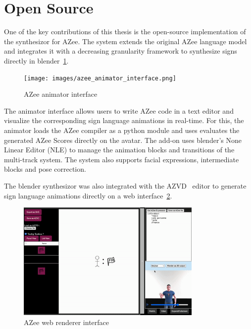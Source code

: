 \documentclass[../../main.tex]{subfiles}
\begin{document}
\section{Open Source}
\label{ch:conclusion:opensource}

One of the key contributions of this thesis is the open-source implementation of the synthesizor for AZee. The system extends the original AZee language model and integrates it with a decreasing granularity framework to synthesize signs directly in blender~\ref{fig:azee_animator_interface}.

\begin{figure}[ht]
    \centering
    \texttt{[image: images/azee\_animator\_interface.png]}
    \caption{AZee animator interface}
    \label{fig:azee_animator_interface}
\end{figure}

The animator interface allows users to write AZee code in a text editor and visualize the corresponding sign language animations in real-time. For this, the animator loads the AZee compiler as a python module and uses evaluates the generated AZee Scores directly on the avatar. The add-on uses blender's None Linear Editor (NLE) to manage the animation blocks and transitions of the multi-track system. The system also supports facial expressions, intermediate blocks and pose correction.

The blender synthesizor was also integrated with the AZVD~\cite{filhol2024software} editor to generate sign language animations directly on a web interface~\ref{fig:azee_web_interface}.

\begin{figure}[ht]
    \centering
    \includegraphics[width=0.8\textwidth]{images/azee_web_interface.png}
    \caption{AZee web renderer interface}
    \label{fig:azee_web_interface}
\end{figure}
\end{document}
